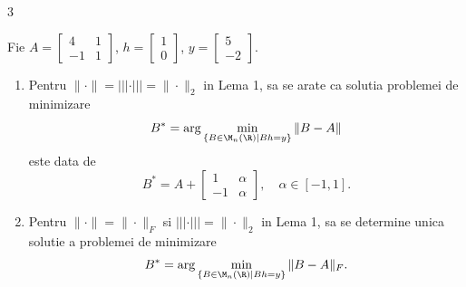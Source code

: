 \begin{exercitiu}{3}

    Fie $A = \begin{bmatrix} 4 & 1 \\ -1 & 1 \end{bmatrix}$, $h = \begin{bmatrix} 1 \\ 0 \end{bmatrix}$, $y = \begin{bmatrix} 5 \\ -2 \end{bmatrix}$.

\begin{enumerate}
    \item Pentru $\|\cdot\| = |||\cdot||| = \|\cdot\|_2$ in Lema 1, sa se arate ca solutia problemei de minimizare
    $$ B^* = \arg \min_{\{B \in \M_n(\R) \mid Bh=y\}} \|B-A\| $$
    este data de
    $$ B^* = A + \begin{bmatrix} 1 & \alpha \\ -1 & \alpha \end{bmatrix}, \quad \alpha \in [-1, 1]. $$

    \item Pentru $\|\cdot\| = \|\cdot\|_F$ si $|||\cdot||| = \|\cdot\|_2$ in Lema 1, sa se determine unica solutie a problemei de minimizare
    $$ B^* = \arg \min_{\{B \in \M_n(\R) \mid Bh=y\}} \|B-A\|_F. $$
\end{enumerate}
\end{exercitiu}

